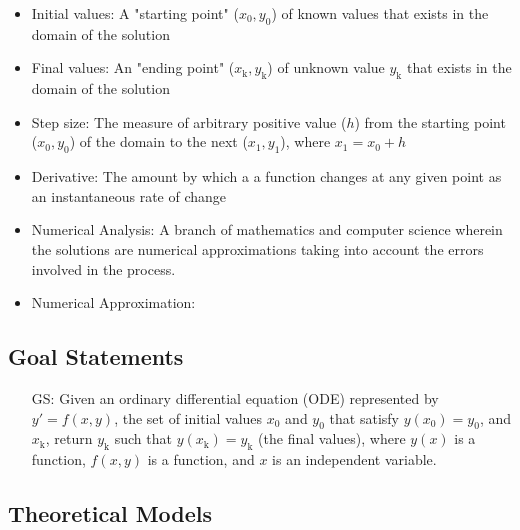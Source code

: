 \documentclass[12pt]{article}
\newcounter{goalnum} %
\begin{document}
\begin{itemize}

\item Initial values: A "starting point" ($x_\text{0}, y_\text{0}$) of known values that exists in the domain of the solution

\item Final values: An "ending point" ($x_\text{k}, y_\text{k}$) of unknown value $y_\text{k}$ that exists in the domain of the solution

\item Step size: The measure of arbitrary positive value ($h$) from the starting point ($x_\text{0}, y_\text{0}$) of the domain to the next ($x_\text{1}, y_\text{1}$), where $x_\text{1} = x_\text{0} + h$

\item Derivative: The amount by which a a function changes at any given point as an instantaneous
rate of change

\item Numerical Analysis: A branch of mathematics and computer science wherein the solutions
are numerical approximations taking into account the errors involved in the process.

\item Numerical Approximation: 

\end{itemize}

\subsection{Goal Statements} \label{Sec_gs}

\begin{itemize}

\item[GS\refstepcounter{goalnum}\thegoalnum \label{G_meaningfulLabel}:]{
Given an ordinary differential equation (ODE) represented by $y'= f(x,y)$, the set of initial values
$x_\text{0}$ and $y_\text{0}$ that satisfy $y(x_\text{0}) = y_\text{0}$, and $x_\text{k}$, return $y_\text{k}$
such that $y(x_\text{k}) = y_\text{k}$ (the final values), where $y(x)$ is a function, $f(x,y)$ is a function,
and $x$ is an independent variable.}

\end{itemize}

\subsection{Theoretical Models}\label{sec_theoretical}
\end{document}
